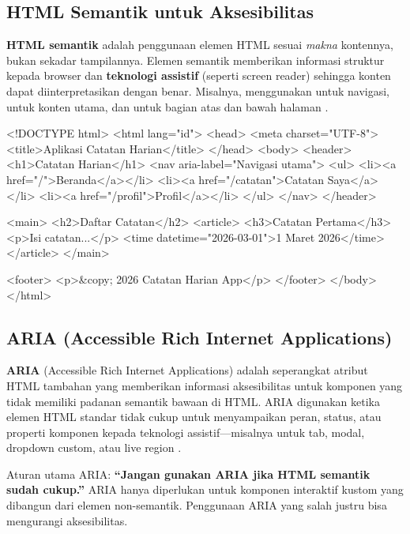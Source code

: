 \subsection{HTML Semantik untuk Aksesibilitas}

\textbf{HTML semantik} adalah penggunaan elemen HTML sesuai \textit{makna} kontennya, bukan sekadar tampilannya. Elemen semantik memberikan informasi struktur kepada browser dan \textbf{teknologi assistif} (seperti screen reader) sehingga konten dapat diinterpretasikan dengan benar. Misalnya, menggunakan  untuk navigasi,  untuk konten utama,  dan  untuk bagian atas dan bawah halaman \cite{mdnHtmlIntro}.

\begin{webcode}[language=HTML, caption={Struktur HTML semantik yang aksesibel}]
<!DOCTYPE html>
<html lang="id">
<head>
  <meta charset="UTF-8">
  <title>Aplikasi Catatan Harian</title>
</head>
<body>
  <header>
    <h1>Catatan Harian</h1>
    <nav aria-label="Navigasi utama">
      <ul>
        <li><a href="/">Beranda</a></li>
        <li><a href="/catatan">Catatan Saya</a></li>
        <li><a href="/profil">Profil</a></li>
      </ul>
    </nav>
  </header>
  
  <main>
    <h2>Daftar Catatan</h2>
    <article>
      <h3>Catatan Pertama</h3>
      <p>Isi catatan...</p>
      <time datetime="2026-03-01">1 Maret 2026</time>
    </article>
  </main>
  
  <footer>
    <p>&copy; 2026 Catatan Harian App</p>
  </footer>
</body>
</html>
\end{webcode}

\subsection{ARIA (Accessible Rich Internet Applications)}

\textbf{ARIA} (Accessible Rich Internet Applications) adalah seperangkat atribut HTML tambahan yang memberikan informasi aksesibilitas untuk komponen yang tidak memiliki padanan semantik bawaan di HTML. ARIA digunakan ketika elemen HTML standar tidak cukup untuk menyampaikan peran, status, atau properti komponen kepada teknologi assistif---misalnya untuk tab, modal, dropdown custom, atau live region \cite{mdnAccessibility}.

Aturan utama ARIA: \textbf{``Jangan gunakan ARIA jika HTML semantik sudah cukup.''} ARIA hanya diperlukan untuk komponen interaktif kustom yang dibangun dari elemen non-semantik. Penggunaan ARIA yang salah justru bisa mengurangi aksesibilitas.


